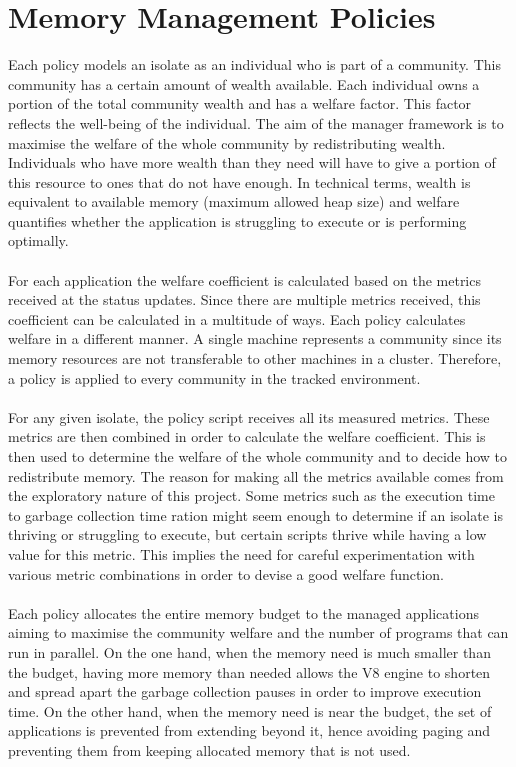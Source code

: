 \documentclass{l4proj}
\begin{document}
\section{Memory Management Policies}
\hspace*{3em} Each policy models an isolate as an individual who is part of a community. This community has a certain amount of wealth available. Each individual owns a portion of the total community wealth and has a welfare factor. This factor reflects the well-being of the individual. The aim of the manager framework is to maximise the welfare of the whole community by redistributing wealth. Individuals who have more wealth than they need will have to give a portion of this resource to ones that do not have enough. In technical terms, wealth is equivalent to available memory (maximum allowed heap size) and welfare quantifies whether the application is struggling to execute or is performing optimally.
\\\\
For each application the welfare coefficient is calculated based on the metrics received at the status updates. Since there are multiple metrics received, this coefficient can be calculated in a multitude of ways. Each policy calculates welfare in a different manner. A single machine represents a community since its memory resources are not transferable to other machines in a cluster. Therefore, a policy is applied to every community in the tracked environment.
\\\\
\hspace*{3em} For any given isolate, the policy script receives all its measured metrics. These metrics are then combined in order to calculate the welfare coefficient. This is then used to determine the welfare of the whole community and to decide how to redistribute memory. The reason for making all the metrics available comes from the exploratory nature of this project. Some metrics such as the execution time to garbage collection time ration might seem enough to determine if an isolate is thriving or struggling to execute, but certain scripts thrive while having a low value for this metric. This implies the need for careful experimentation with various metric combinations in order to devise a good welfare function.
\\\\
\hspace*{3em} Each policy allocates the entire memory budget to the managed applications aiming to maximise the community welfare and the number of programs that can run in parallel. On the one hand, when the memory need is much smaller than the budget, having more memory than needed allows the V8 engine to shorten and spread apart the garbage collection pauses in order to improve execution time. On the other hand, when the memory need is near the budget, the set of applications is prevented from extending beyond it, hence avoiding paging and preventing them from keeping allocated memory that is not used.
\end{document}
